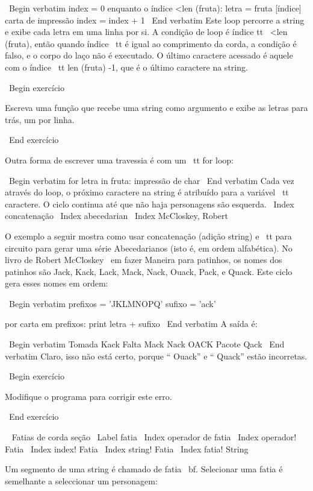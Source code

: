 \documentclass[10pt]{book}
\begin{document}
\begin {itemize}
{{{{\ Begin {verbatim}
index = 0
enquanto o índice <len (fruta):
    letra = fruta [índice]
    carta de impressão
    index = index + 1
\ End {verbatim}
%
Este loop percorre a string e exibe cada letra em uma linha por
si. A condição de loop é {índice tt \ <len (fruta)}, então
quando {índice \ tt} é igual ao comprimento da corda, a
condição é falso, e o corpo do laço não é executado. O
último caractere acessado é aquele com o índice {\ tt len ​​(fruta) -1},
que é o último caractere na string.

\ Begin {} exercício

Escreva uma função que recebe uma string como argumento
e exibe as letras para trás, um por linha.

\ End {} exercício

Outra forma de escrever uma travessia é com um {\ tt for} loop:

\ Begin {verbatim}
for letra in fruta:
    impressão de char
\ End {verbatim}
%
Cada vez através do loop, o próximo caractere na string é atribuído
para a variável {\ tt caractere}. O ciclo continua até que não haja personagens são
esquerda.
\ Index {concatenação}
\ Index {} abecedarian
\ Index {McCloskey, Robert}

O exemplo a seguir mostra como usar concatenação (adição string)
e {\ tt} para circuito para gerar uma série Abecedarianos (isto é, em
ordem alfabética). No livro de Robert McCloskey {\ em fazer
Maneira para patinhos}, os nomes dos patinhos são Jack, Kack, Lack,
Mack, Nack, Ouack, Pack, e Quack. Este ciclo gera esses nomes em
ordem:

\ Begin {verbatim}
prefixos = 'JKLMNOPQ'
sufixo = 'ack'

por carta em prefixos:
    print letra + sufixo
\ End {verbatim}
%
A saída é:

\ Begin {verbatim}
Tomada
Kack
Falta
Mack
Nack
OACK
Pacote
Qack
\ End {verbatim}
%
Claro, isso não está certo, porque `` Ouack'' e
`` Quack'' estão incorretas.

\ Begin {} exercício

Modifique o programa para corrigir este erro.

\ End {} exercício



\ {} Fatias de corda seção
\ Label {fatia}
\ Index {operador de fatia}
\ Index {operador! Fatia}
\ Index {index! Fatia}
\ Index {string! Fatia}
\ Index {fatia! String}

Um segmento de uma string é chamado de fatia {\ bf}. Selecionar uma fatia é
semelhante a seleccionar um personagem:

}}}}
\end{itemize}
\end{document}
